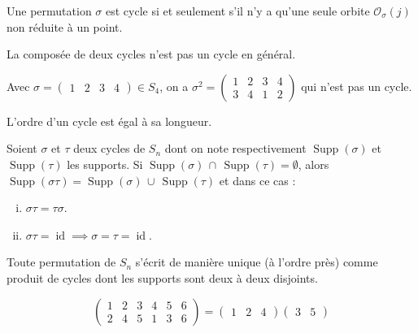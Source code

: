 	
	\begin{proposition}
		Une permutation $\sigma$ est cycle si et seulement s'il n'y a qu'une seule orbite $\mathcal{O}_\sigma(j)$ non réduite à un point.
	\end{proposition}
	
	\begin{remark}
		La composée de deux cycles n'est pas un cycle en général.
	\end{remark}
	
	\begin{example}
		Avec $\sigma = \begin{pmatrix} 1 & 2 & 3 & 4 \end{pmatrix} \in S_4$, on a $\sigma^2 = \begin{pmatrix} 1 & 2 & 3 & 4 \\ 3 & 4 & 1 & 2 \end{pmatrix}$ qui n'est pas un cycle.
	\end{example}
	
	\begin{proposition}
		L'ordre d'un cycle est égal à sa longueur.
	\end{proposition}
	
	
	\begin{proposition}
		Soient $\sigma$ et $\tau$ deux cycles de $S_n$ dont on note respectivement $\operatorname{Supp}(\sigma)$ et $\operatorname{Supp}(\tau)$ les supports. Si $\operatorname{Supp}(\sigma) \, \cap \, \operatorname{Supp}(\tau) = \emptyset$, alors $\operatorname{Supp}(\sigma\tau) = \operatorname{Supp}(\sigma) \, \cup \, \operatorname{Supp}(\tau)$ et dans ce cas :
		\begin{enumerate}[(i)]
			\item $\sigma\tau = \tau\sigma$.
			\item $\sigma\tau = \operatorname{id} \implies \sigma = \tau = \operatorname{id}$.
		\end{enumerate}
	\end{proposition}
	
	\begin{theorem}
		Toute permutation de $S_n$ s'écrit de manière unique (à l'ordre près) comme produit de cycles dont les supports sont deux à deux disjoints.
	\end{theorem}
	
	\begin{example}
		\label{105-1}
		\[
		\begin{pmatrix}
			1 & 2 & 3 & 4 & 5 & 6 \\
			2 & 4 & 5 & 1 & 3 & 6
		\end{pmatrix}
		=
		\begin{pmatrix} 1 & 2 & 4 \end{pmatrix}\begin{pmatrix} 3 & 5 \end{pmatrix}
		\]
	\end{example}
	
